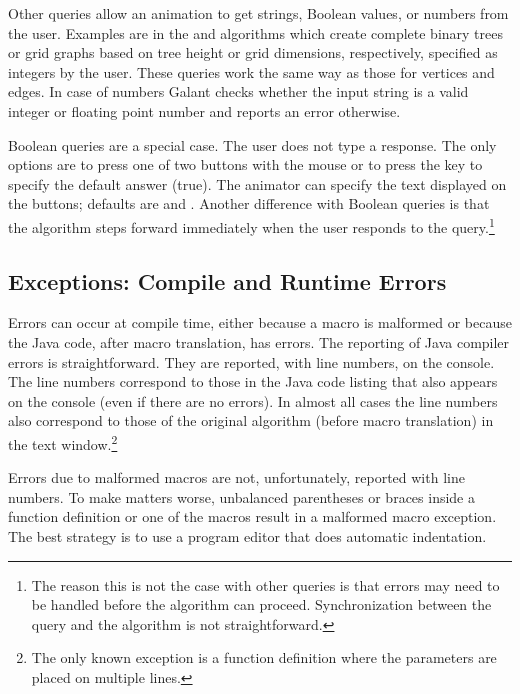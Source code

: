 Other queries allow an animation to get strings, Boolean values, or numbers
from the user. Examples are in the  and 
algorithms which create complete binary trees or grid graphs based on tree
height or grid dimensions, respectively, specified as integers by the user.
These queries work the same way as those for vertices and edges. In case of
numbers Galant checks whether the input string is a valid integer or
floating point number and reports an error otherwise.

Boolean queries are a special case. The user does not type a response. The
only options are to press one of two buttons with the mouse or to press the
 key to specify the default answer (true).
The animator can specify the text displayed on the buttons; defaults are
 and .
Another difference with Boolean queries is that the algorithm steps forward
immediately when the user responds to the query.\footnote{The reason this is
  not the case with other queries is that errors may need to be handled
  before the algorithm can proceed. Synchronization between the query and the
  algorithm is not straightforward.}

\subsection{Exceptions: Compile and Runtime Errors}



Errors can occur at compile time, either because a macro is malformed or
because the Java code, after macro translation, has errors.
The reporting of Java compiler errors is straightforward. They are reported,
with line numbers, on the console. The line numbers correspond to those in
the Java code listing that also appears on the console (even if there are no
errors). In almost all cases the line numbers also correspond to those of the
original algorithm (before macro translation) in the text
window.\footnote{The only known exception is a function definition where the
  parameters are placed on multiple lines.}

Errors due to malformed macros are not, unfortunately, reported with line
numbers. To make matters worse, unbalanced parentheses or braces inside a
function definition or one of the  macros result in a
malformed macro exception. The best strategy is to use a program editor that
does automatic indentation.

